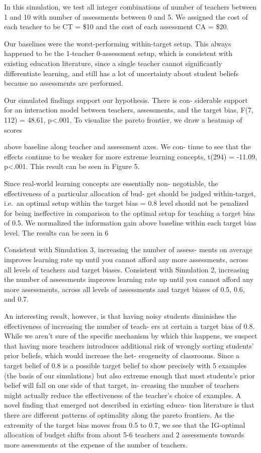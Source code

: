 \documentclass[10pt, letterpaper]{article}
\begin{document}
In this simulation, we test all integer combinations of number of
teachers between 1 and 10 with number of assessments between 0 and 5. We
assigned the cost of each teacher to be CT = \$10 and the cost of each
assessment CA = \$20.

Our baselines were the worst-performing within-target setup. This always
happened to be the 1-teacher 0-assessment setup, which is consistent
with existing education literature, since a single teacher cannot
significantly differentiate learning, and still has a lot of uncertainty
about student beliefs because no assessments are performed.

Our simulated findings support our hypothesis. There is con- siderable
support for an interaction model between teachers, assessments, and the
target bias, F(7, 112) = 48.61, p\textless{}.001. To visualize the
pareto frontier, we draw a heatmap of scores

above baseline along teacher and assessment axes. We con- tinue to see
that the effects continue to be weaker for more extreme learning
concepts, t(294) = -11.09, p\textless{}.001. This result can be seen in
Figure 5.

Since real-world learning concepts are essentially non- negotiable, the
effectiveness of a particular allocation of bud- get should be judged
within-target, i.e.~an optimal setup within the target bias = 0.8 level
should not be penalized for being ineffective in comparison to the
optimal setup for teaching a target bias of 0.5. We normalized the
information gain above baseline within each target bias level. The
results can be seen in 6

Consistent with Simulation 3, increasing the number of assess- ments on
average improves learning rate up until you cannot afford any more
assessments, across all levels of teachers and target biases. Consistent
with Simulation 2, increasing the number of assessments improves
learning rate up until you cannot afford any more assessments, across
all levels of assessments and target biases of 0.5, 0.6, and 0.7.

An interesting result, however, is that having noisy students diminishes
the effectiveness of increasing the number of teach- ers at certain a
target bias of 0.8. While we aren't sure of the specific mechanism by
which this happens, we suspect that having more teachers introduces
additional risk of wrongly sorting students' prior beliefs, which would
increase the het- erogeneity of classrooms. Since a target belief of 0.8
is a possible target belief to show precisely with 5 examples (the basis
of our simulations) but also extreme enough that most students's prior
belief will fall on one side of that target, in- creasing the number of
teachers might actually reduce the effectiveness of the teacher's choice
of examples. A novel finding that emerged not described in existing
educa- tion literature is that there are different patterns of
optimality along the pareto frontiers. As the extremity of the target
bias moves from 0.5 to 0.7, we see that the IG-optimal allocation of
budget shifts from about 5-6 teachers and 2 assessments towards more
assessments at the expense of the number of teachers.
\end{document}
